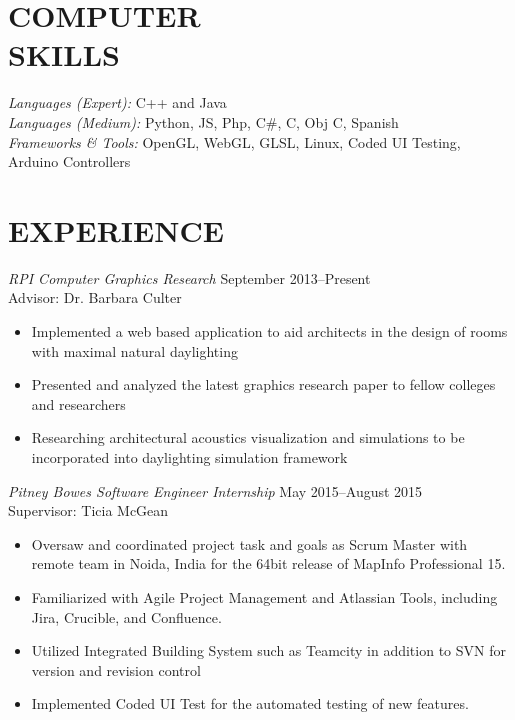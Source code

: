 \documentclass[margin, 10pt]{res}
\begin{document}
\begin{resume}

\section{COMPUTER \\ SKILLS} 

{\sl Languages (Expert):}  C++ and Java \\
{\sl Languages (Medium):} Python, JS, Php, C#, C, Obj C, Spanish \\
{\sl Frameworks \& Tools:} OpenGL, WebGL, GLSL, Linux, Coded UI Testing, Arduino Controllers
 
%
%  
 
\section{EXPERIENCE}

{\sl RPI Computer Graphics Research} \hfill September 2013--Present\\
Advisor: Dr. Barbara Culter
\begin{itemize} \itemsep -2.5pt %
    \item Implemented a web based application to aid architects in the design of rooms with maximal natural daylighting
    \item Presented and analyzed the latest graphics research paper to fellow colleges and researchers
    \item Researching architectural acoustics visualization and simulations to be incorporated into daylighting simulation framework
\end{itemize}

{\sl Pitney Bowes Software Engineer Internship} \hfill May 2015--August 2015\\
Supervisor: Ticia McGean
\begin{itemize} \itemsep -2.5pt %
    \item Oversaw and coordinated project task and goals as Scrum Master with remote team in Noida, India for the 64bit release of MapInfo Professional 15.
    \item Familiarized with Agile Project Management and Atlassian Tools, including Jira, Crucible, and Confluence.
    \item Utilized Integrated Building System such as Teamcity in addition to SVN for version and revision control
    \item Implemented Coded UI Test for the automated testing of new features.  
\end{itemize}


\end{resume}
\end{document}
